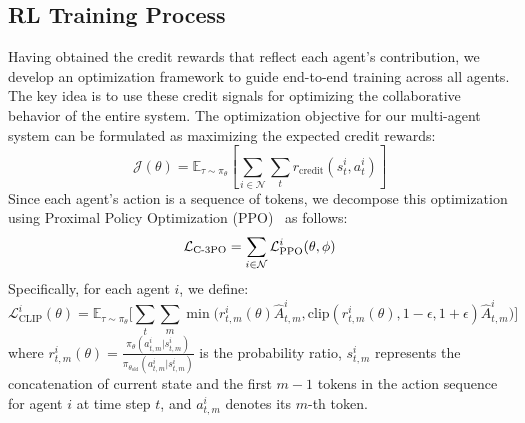 \subsection{RL Training Process}\label{app:ppo_details}
Having obtained the credit rewards that reflect each agent's contribution, we develop an optimization framework to guide end-to-end training across all agents. %
The key idea is to use these credit signals for optimizing the collaborative behavior of the entire system.
The optimization objective for our multi-agent system can be formulated as maximizing the expected credit rewards:
\begin{equation}
    \mathcal{J}(\theta) = \mathbb{E}_{\tau \sim \pi_\theta}\left[\sum_{i\in \mathcal{N}}\sum_{t} r_{\text{credit}}(s^i_t, a^i_t)\right]
\end{equation}
Since each agent's action is a sequence of tokens, we decompose this optimization using Proximal Policy Optimization (PPO)~\citep{SchulmanWDRK17,abs-2312-01058,ZhuDW24} as follows:
\begin{equation}
    \mathcal{L}_{\text{C-3PO}} = \sum_{i\in\mathcal{N}} \mathcal{L}_{\text{PPO}}^i(\theta, \phi)
\end{equation}
Specifically, for each agent $i$, we define:
\begin{equation}
    \mathcal{L}_{\text{CLIP}}^i(\theta)
    = \mathbb{E}_{\tau \sim \pi_\theta}\Big[\sum_{t}\sum_{m} \min\big(r_{t,m}^i(\theta)\hat{A}_{t,m}^i, \text{clip}(r_{t,m}^i(\theta), 1-\epsilon, 1+\epsilon)\hat{A}_{t,m}^i\big)\Big]
\end{equation}
where $r_{t,m}^i(\theta) = \frac{\pi_\theta(a_{t,m}^i|s_{t,m}^i)}{\pi_{\theta_{\text{old}}}(a_{t,m}^i|s_{t,m}^i)}$ is the probability ratio, $s_{t,m}^i$ represents the concatenation of current state and the first $m-1$ tokens in the action sequence for agent $i$ at time step $t$, and $a_{t,m}^i$ denotes its $m$-th token.
